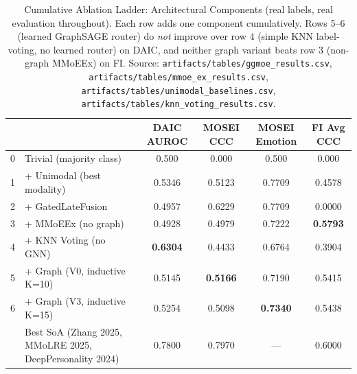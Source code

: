 \begin{table}[htbp]
\centering
\caption{Cumulative Ablation Ladder: Architectural Components (real labels, real evaluation throughout). Each row adds one component cumulatively. Rows 5--6 (learned GraphSAGE router) do \emph{not} improve over row 4 (simple KNN label-voting, no learned router) on DAIC, and neither graph variant beats row 3 (non-graph MMoEEx) on FI. Source: \texttt{artifacts/tables/ggmoe\_results.csv}, \texttt{artifacts/tables/mmoe\_ex\_results.csv}, \texttt{artifacts/tables/unimodal\_baselines.csv}, \texttt{artifacts/tables/knn\_voting\_results.csv}.}
\label{tab:ablation_ladder}
\begin{tabular}{llcccc}
\toprule
 & & DAIC AUROC & MOSEI CCC & MOSEI Emotion & FI Avg CCC \\
\midrule
0 & Trivial (majority class) & 0.500 & 0.000 & 0.500 & 0.000 \\
1 & + Unimodal (best modality) & 0.5346 & 0.5123 & 0.7709 & 0.4578 \\
2 & + GatedLateFusion & 0.4957 & 0.6229 & 0.7709 & 0.0000 \\
3 & + MMoEEx (no graph) & 0.4928 & 0.4979 & 0.7222 & \textbf{0.5793} \\
4 & + KNN Voting (no GNN) & \textbf{0.6304} & 0.4433 & 0.6764 & 0.3904 \\
5 & + Graph (V0, inductive K=10) & 0.5145 & \textbf{0.5166} & 0.7190 & 0.5415 \\
6 & + Graph (V3, inductive K=15) & 0.5254 & 0.5098 & \textbf{0.7340} & 0.5438 \\
\midrule
 & Best SoA (Zhang 2025, MMoLRE 2025, DeepPersonality 2024) & 0.7800 & 0.7970 & --- & 0.6000 \\
\bottomrule
\end{tabular}
\end{table}